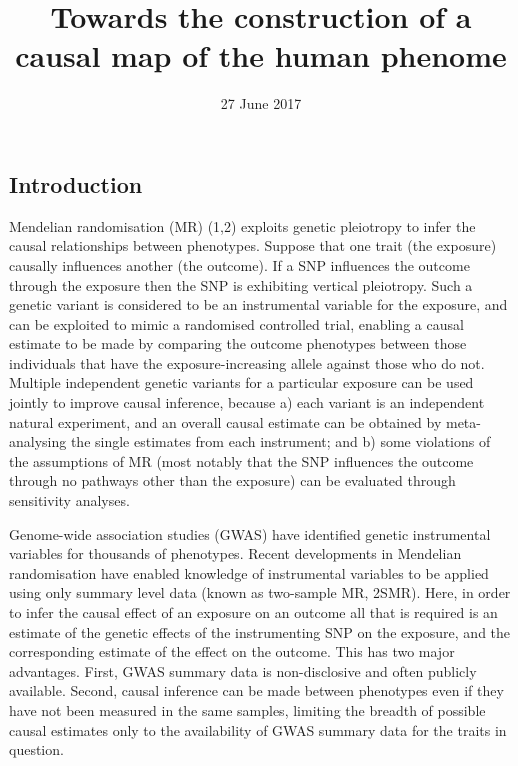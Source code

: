 \documentclass[]{article}
\title{Towards the construction of a causal map of the human phenome}
\author{}
\date{27 June 2017}
\begin{document}
\maketitle

\subsection{Introduction}\label{introduction}

Mendelian randomisation (MR) (1,2) exploits genetic pleiotropy to infer
the causal relationships between phenotypes. Suppose that one trait (the
exposure) causally influences another (the outcome). If a SNP influences
the outcome through the exposure then the SNP is exhibiting vertical
pleiotropy. Such a genetic variant is considered to be an instrumental
variable for the exposure, and can be exploited to mimic a randomised
controlled trial, enabling a causal estimate to be made by comparing the
outcome phenotypes between those individuals that have the
exposure-increasing allele against those who do not. Multiple
independent genetic variants for a particular exposure can be used
jointly to improve causal inference, because a) each variant is an
independent natural experiment, and an overall causal estimate can be
obtained by meta-analysing the single estimates from each instrument;
and b) some violations of the assumptions of MR (most notably that the
SNP influences the outcome through no pathways other than the exposure)
can be evaluated through sensitivity analyses.

Genome-wide association studies (GWAS) have identified genetic
instrumental variables for thousands of phenotypes. Recent developments
in Mendelian randomisation have enabled knowledge of instrumental
variables to be applied using only summary level data (known as
two-sample MR, 2SMR). Here, in order to infer the causal effect of an
exposure on an outcome all that is required is an estimate of the
genetic effects of the instrumenting SNP on the exposure, and the
corresponding estimate of the effect on the outcome. This has two major
advantages. First, GWAS summary data is non-disclosive and often
publicly available. Second, causal inference can be made between
phenotypes even if they have not been measured in the same samples,
limiting the breadth of possible causal estimates only to the
availability of GWAS summary data for the traits in question.
\end{document}

